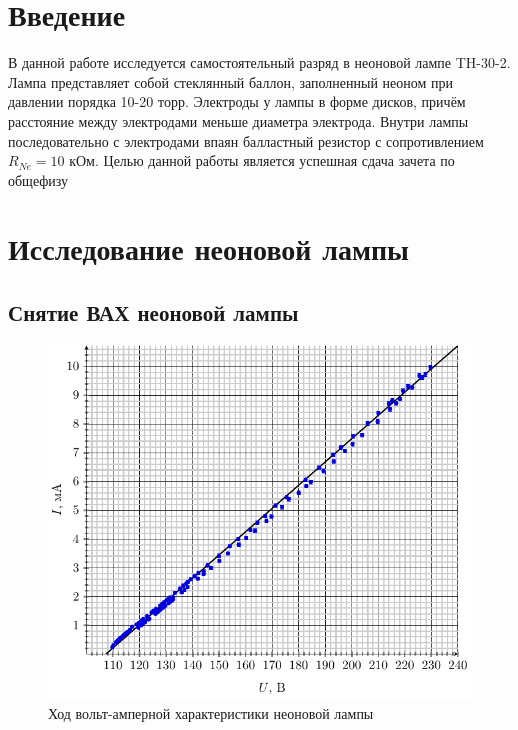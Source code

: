 





\tableofcontents
\newpage

\section*{Введение}
\label{sec:input}
В данной работе исследуется самостоятельный разряд в неоновой лампе TH-30-2. Лампа представляет собой стеклянный баллон, заполненный неоном при давлении порядка 10-20 торр. Электроды у лампы в форме дисков, причём расстояние между электродами меньше диаметра электрода. Внутри лампы последовательно с электродами впаян балластный резистор с сопротивлением $R_{Ne}=10$ кОм.  
Целью данной работы является успешная сдача зачета по общефизу

\newpage
\section{Исследование неоновой лампы}
\subsection{Снятие ВАХ неоновой лампы}



\newpage

\begin{figure}[H]
	\centering
	\includegraphics[width=\textwidth]{vax}
	\caption{Ход вольт-амперной характеристики неоновой лампы}
	\label{fig:figure1}
\end{figure}

